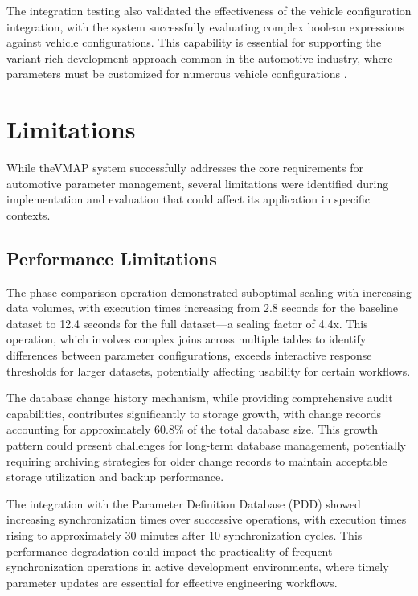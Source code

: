The integration testing also validated the effectiveness of the vehicle configuration integration, with the system successfully evaluating complex boolean expressions against vehicle configurations. This capability is essential for supporting the variant-rich development approach common in the automotive industry, where parameters must be customized for numerous vehicle configurations \cite{staron2021autosar}.

\section{Limitations}
\label{sec:limitations}

While the\ac{VMAP} system successfully addresses the core requirements for automotive parameter management, several limitations were identified during implementation and evaluation that could affect its application in specific contexts.

\subsection{Performance Limitations}
\label{subsec:performance-limitations}

The phase comparison operation demonstrated suboptimal scaling with increasing data volumes, with execution times increasing from 2.8 seconds for the baseline dataset to 12.4 seconds for the full dataset—a scaling factor of 4.4x. This operation, which involves complex joins across multiple tables to identify differences between parameter configurations, exceeds interactive response thresholds for larger datasets, potentially affecting usability for certain workflows.

The database change history mechanism, while providing comprehensive audit capabilities, contributes significantly to storage growth, with change records accounting for approximately 60.8\% of the total database size. This growth pattern could present challenges for long-term database management, potentially requiring archiving strategies for older change records to maintain acceptable storage utilization and backup performance.

The integration with the Parameter Definition Database (PDD) showed increasing synchronization times over successive operations, with execution times rising to approximately 30 minutes after 10 synchronization cycles. This performance degradation could impact the practicality of frequent synchronization operations in active development environments, where timely parameter updates are essential for effective engineering workflows.

